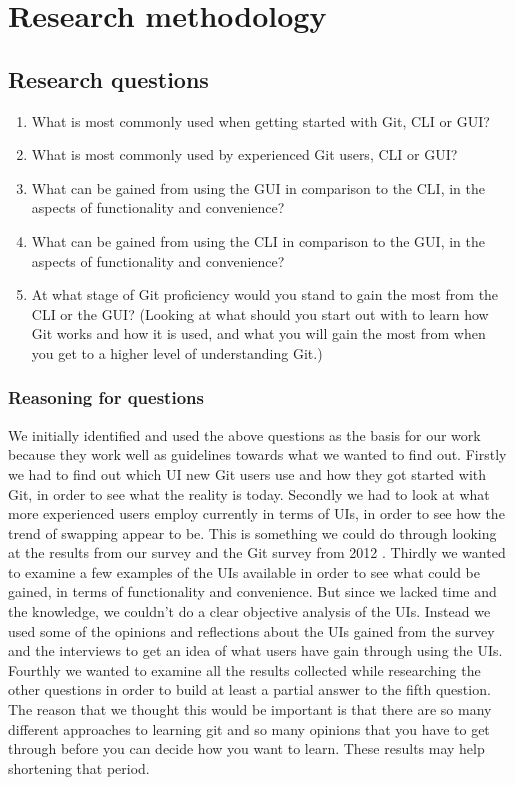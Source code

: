 \documentclass[a4paper,oneside]{bth} %
\begin{document}
		\chapter{Research methodology}
			\section{Research questions}
			\begin{enumerate}
				\item What is most commonly used when getting started with Git, CLI or GUI?
				\item What is most commonly used by experienced Git users, CLI or GUI?
				\item What can be gained from using the GUI in comparison to the CLI, in the aspects of functionality and convenience?
				\item What can be gained from using the CLI in comparison to the GUI, in the aspects of functionality and convenience?
				\item At what stage of Git proficiency would you stand to gain the most from the CLI or the GUI? (Looking at what should you start out with to learn how Git works and how it is used, and what you will gain the most from when you get to a higher level of understanding Git.)
			\end{enumerate}
				\subsection{Reasoning for questions}
				We initially identified and used the above questions as the basis for our work because they work well as guidelines towards what we wanted to find out. Firstly we had to find out which UI new Git users use and how they got started with Git, in order to see what the reality is today. Secondly we had to look at what more experienced users employ currently in terms of UIs, in order to see how the trend of swapping appear to be. This is something we could do through looking at the results from our survey and the Git survey from 2012 \cite{GitUserSurvey}. Thirdly we wanted to examine a few examples of the UIs available in order to see what could be gained, in terms of functionality and convenience. But since we lacked time and the knowledge, we couldn't do a clear objective analysis of the UIs. Instead we used some of the opinions and reflections about the UIs gained from the survey and the interviews to get an idea of what users have gain through using the UIs. 
				Fourthly we wanted to examine all the results collected while researching the other questions in order to build at least a partial answer to the fifth question.\\
				The reason that we thought this would be important is that there are so many different approaches to learning git and so many opinions that you have to get through before you can decide how you want to learn. These results may help shortening that period.
\end{document}

